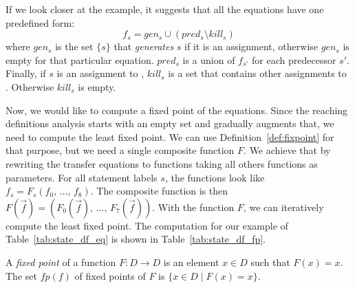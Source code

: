 If we look closer at the example, it suggests that all the equations have one
predefined form:
\begin{equation*}
f_s = gen_s \cup (pred_s \setminus kill_s)
\end{equation*}
where $gen_s$ is the set $\{s\}$ that \emph{generates} $s$ if it is an
assignment, otherwise $gen_s$ is empty for that particular equation.  $pred_s$
is a union of $f_{s'}$ for each predecessor $s'$.  Finally, if $s$ is an
assignment to , $kill_s$ is a set that contains other assignments to
.  Otherwise $kill_s$ is empty.

Now, we would like to compute a fixed point of the equations. Since the
reaching definitions analysis starts with an empty set and gradually augments
that, we need to compute the least fixed point. We can use
Definition~\ref{def:fixpoint} for that purpose, but we need a single composite
function $F$. We achieve that by rewriting the transfer equations to functions
taking all others functions as parameters. For all statement labels $s$, the
functions look like $f_s=F_s(f_0,\, \dots,\, f_8)$. The composite function is
then $F(\overrightarrow{f})=(F_0(\overrightarrow{f}),\, \dots,\,
F_7(\overrightarrow{f}))$. With the function $F$, we can iteratively compute
the least fixed point. The computation for our example of
Table~\ref{tab:state_df_eq} is shown in Table~\ref{tab:state_df_fp}.

\begin{dfn}\label{def:fixpoint}
A \emph{fixed point} of a function $F : D \rightarrow D$ is an element $x \in
D$ such that $F(x) = x$. The set $fp(f)$ of fixed points of $F$ is $\{x \in D
\mid F(x) = x \}$.
\end{dfn}

